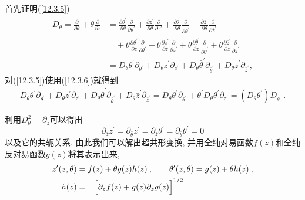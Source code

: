 \begin{tcolorbox}
首先证明(\ref{12.3.5}) 
\begin{align*}
    D_{\theta} = \frac{\partial}{\partial \theta} + \theta \frac{\partial}{\partial z}
    &= \frac{\partial \theta^{\prime}}{\partial \theta} \frac{\partial}{\partial \theta^{\prime}}
    + \frac{\partial z^{\prime}}{\partial \theta} \frac{\partial}{\partial z^{\prime}} 
    +\frac{\partial \bar{\theta}^{\prime}}{\partial \theta} \frac{\partial}{\partial \bar{\theta^{\prime}}}
    + \frac{\partial \bar{z}^{\prime}}{\partial \theta} \frac{\partial}{\partial \bar{z}^{\prime}} \\
    &\quad+ \theta \frac{\partial \theta^{\prime}}{\partial z}\frac{\partial}{\partial \theta^{\prime}}
    +\theta \frac{\partial z^{\prime}}{\partial z}\frac{\partial}{\partial z^{\prime}}
    + \theta \frac{\partial \bar{\theta}^{\prime}}{\partial z}\frac{\partial}{\partial \bar{\theta}^{\prime}}
    +\theta \frac{\partial \bar{z}^{\prime}}{\partial z}\frac{\partial}{\partial \bar{z}^{\prime}} \\
    &=D_{\theta} \theta^{\prime} \partial_{\theta^{\prime}}
    +D_{\theta}z^{\prime}\partial_{z^{\prime}} + D_{\theta}\bar{\theta}^{\prime}\partial_{\bar{\theta}^{\prime}}
    +D_{\theta}\bar{z}^{\prime}\partial_{\bar{z}^{\prime}} ,
\end{align*}
对(\ref{12.3.5})使用(\ref{12.3.6})就得到
\begin{align*}
    D_{\theta} \theta^{\prime} \partial_{\theta^{\prime}}
    +D_{\theta}z^{\prime}\partial_{z^{\prime}} + D_{\theta}\bar{\theta}^{\prime}\partial_{\bar{\theta}^{\prime}}
    +D_{\theta}\bar{z}^{\prime}\partial_{\bar{z}^{\prime}}
    =D_{\theta} \theta^{\prime} \partial_{\theta^{\prime}}
    +\theta^{\prime}D_{\theta}\theta^{\prime}\partial_{z^{\prime}}=(D_{\theta}\theta^{\prime})D_{\theta^{\prime}}\:.
\end{align*}
\end{tcolorbox}
\noindent 利用$ D_{\theta}^{2}=\partial_{z} $可以得出
\begin{equation}
    \partial_{\bar{z}}z^{\prime}=\partial_{\bar{\theta}}z^{\prime}=\partial_{\bar{z}}\theta^{\prime}
    =\partial_{\bar{\theta}}\theta^{\prime} =0  \label{12.3.8}
\end{equation}
以及它的共轭关系. 由此我们可以解出超共形变换, 并用全纯对易函数$ f(z) $和全纯反对易函数$ g(z) $将其表示出来,
\begin{subequations}
\begin{align}
    z^{\prime}(z,\theta) &= f(z)+\theta g(z)h(z) \:, \qquad 
    \theta^{\prime}(z,\theta)=g(z)+\theta h(z) \:, \label{12.3.9a} \\
    h(z) &= \pm\Bigl[\partial_{z}f(z)+g(z)\partial_{z}g(z)\Bigr]^{1/2} \label{12.3.9b}
\end{align} \label{12.3.9}
\end{subequations}
